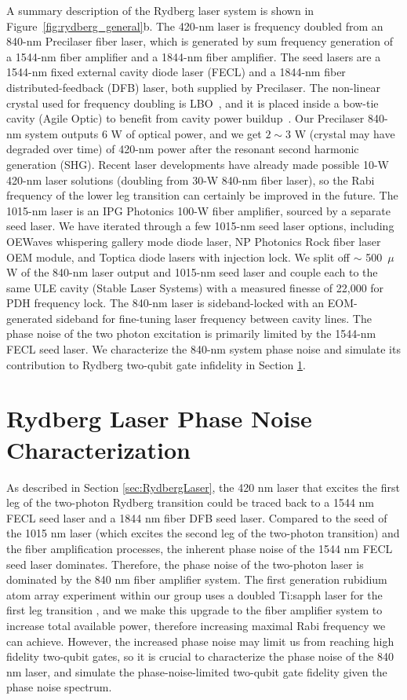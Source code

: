 \documentclass[11pt]{report}
\begin{document}
A summary description of the Rydberg laser system is shown in Figure~\ref{fig:rydberg_general}b. The 420-nm laser is frequency doubled from an 840-nm Precilaser fiber laser, which is generated by sum frequency generation of a 1544-nm fiber amplifier and a 1844-nm fiber amplifier. The seed lasers are a 1544-nm fixed external cavity diode laser (FECL) and a 1844-nm fiber distributed-feedback (DFB) laser, both supplied by Precilaser. The non-linear crystal used for frequency doubling is LBO~\cite{Velsko1991}, and it is placed inside a bow-tie cavity (Agile Optic) to benefit from cavity power buildup~\cite{Hannig2018}. Our Precilaser 840-nm system outputs 6 W of optical power, and we get $2\sim3$ W (crystal may have degraded over time) of 420-nm power after the resonant second harmonic generation (SHG). Recent laser developments have already made possible 10-W 420-nm laser solutions (doubling from 30-W 840-nm fiber laser), so the Rabi frequency of the lower leg transition can certainly be improved in the future. The 1015-nm laser is an IPG Photonics 100-W fiber amplifier, sourced by a separate seed laser. We have iterated through a few 1015-nm seed laser options, including OEWaves whispering gallery mode diode laser, NP Photonics Rock fiber laser OEM module, and Toptica diode lasers with injection lock. We split off $\sim$ 500~$\mu$W of the 840-nm laser output and 1015-nm seed laser and couple each to the same ULE cavity (Stable Laser Systems) with a measured finesse of 22,000 for PDH frequency lock. The 840-nm laser is sideband-locked with an EOM-generated sideband for fine-tuning laser frequency between cavity lines. The phase noise of the two photon excitation is primarily limited by the 1544-nm FECL seed laser. We characterize the 840-nm system phase noise and simulate its contribution to Rydberg two-qubit gate infidelity in Section \ref{sec:phase_noise}.


\section{Rydberg Laser Phase Noise Characterization}
\label{sec:phase_noise}

As described in Section \ref{sec:RydbergLaser}, the 420 nm laser that excites the first leg of the two-photon Rydberg transition could be traced back to a 1544 nm FECL seed laser and a 1844 nm fiber DFB seed laser. Compared to the seed of the 1015 nm laser (which excites the second leg of the two-photon transition) and the fiber amplification processes, the inherent phase noise of the 1544 nm FECL seed laser dominates. Therefore, the phase noise of the two-photon laser is dominated by the 840 nm fiber amplifier system. The first generation rubidium atom array experiment within our group uses a doubled Ti:sapph laser for the first leg transition \cite{Evered2023}, and we make this upgrade to the fiber amplifier system to increase total available power, therefore increasing maximal Rabi frequency we can achieve. However, the increased phase noise may limit us from reaching high fidelity two-qubit gates, so it is crucial to characterize the phase noise of the 840 nm laser, and simulate the phase-noise-limited two-qubit gate fidelity given the phase noise spectrum. 
\end{document}
